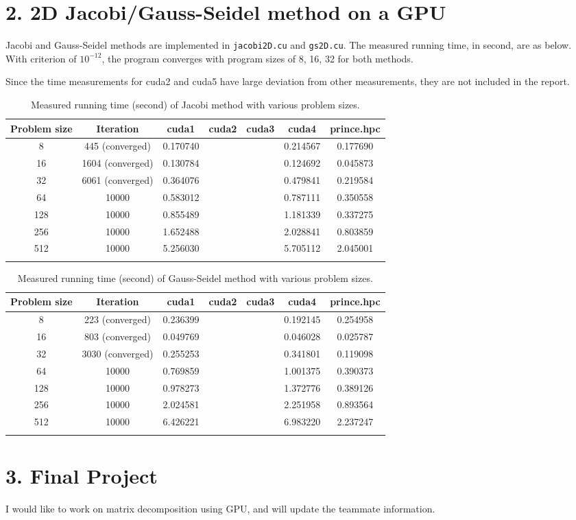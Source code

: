 \documentclass[amsmath,amssymb]{revtex4}
\begin{document}
\section{\label{sec:sec2}2. 2D Jacobi/Gauss-Seidel method on a GPU}
Jacobi and Gauss-Seidel methods are implemented in {\tt jacobi2D.cu} and {\tt gs2D.cu}. The measured running time, in second, are as below. With criterion of $10^{-12}$, the program converges with program sizes of 8, 16, 32 for both methods.

Since the time measurements for cuda2 and cuda5 have large deviation from other measurements, they are not included in the report.

\begin{longtable}{c | c | c | c | c | c | c}
    \hline 
Problem size & Iteration & cuda1 & cuda2 & cuda3 & cuda4 & prince.hpc \\ \hline \hline
8 &445 (converged)&0.170740&  &	 & 0.214567  & 0.177690 \\\hline
16 &1604 (converged)&0.130784&  &	 & 0.124692  & 0.045873 \\\hline
32 &6061 (converged)&0.364076&  &	 & 0.479841  & 0.219584 \\\hline
64 &10000&0.583012&  &	 & 0.787111  & 0.350558 \\\hline
128 &10000&0.855489&  &	 & 1.181339  & 0.337275 \\\hline
256 &10000&1.652488&  & & 2.028841  & 0.803859 \\\hline
512 &10000&5.256030&  &	 & 5.705112  & 2.045001 \\\hline
\caption{Measured running time (second) of Jacobi method with various problem sizes.}
\end{longtable}

\begin{longtable}{c | c | c | c | c | c | c}
    \hline 
Problem size& Iteration & cuda1 & cuda2 & cuda3 & cuda4 & prince.hpc \\ \hline \hline
8 &223 (converged)&0.236399&  &	 & 0.192145  &0.254958 \\\hline
16 &803 (converged)&0.049769&  &	 & 0.046028  & 0.025787 \\\hline
32 &3030 (converged)&0.255253&  &	 & 0.341801  & 0.119098 \\\hline
64 &10000&0.769859&  &	 & 1.001375  & 0.390373 \\\hline
128 &10000&0.978273&  &	 & 1.372776  & 0.389126 \\\hline
256 &10000&2.024581&  &	 & 2.251958  & 0.893564 \\\hline
512 &10000&6.426221&  & & 6.983220  & 2.237247 \\\hline
\caption{Measured running time (second) of Gauss-Seidel method with various problem sizes.}
\end{longtable}

\section{\label{sec:sec3}3. Final Project}
I would like to work on matrix decomposition using GPU, and will update the teammate information.
\end{document}
